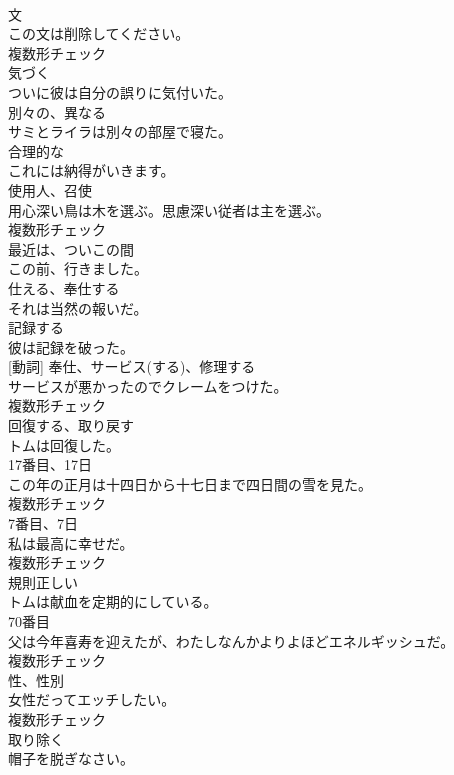 \documentclass[8pt]{extreport}
\begin{document}
\begin{CJK}{UTF8}{min}
\\	[名詞]	文	
\\	この文は削除してください。	
\\	複数形チェック
\\	[動詞]	気づく	
\\	ついに彼は自分の誤りに気付いた。	
\\	[形容詞]	別々の、異なる	
\\	サミとライラは別々の部屋で寝た。	
\\	[形容詞]	合理的な	
\\	これには納得がいきます。	
\\	[名詞]	使用人、召使	
\\	用心深い鳥は木を選ぶ。思慮深い従者は主を選ぶ。	
\\	複数形チェック
\\	[副詞]	最近は、ついこの間	
\\	この前、行きました。	
\\	[動詞]	仕える、奉仕する	
\\	それは当然の報いだ。	
\\	[動詞]	記録する	
\\	彼は記録を破った。	
\\	[名詞] [動詞]	奉仕、サービス(する)、修理する	
\\	サービスが悪かったのでクレームをつけた。	
\\	複数形チェック
\\	[動詞]	回復する、取り戻す	
\\	トムは回復した。	
\\	[名詞]	17番目、17日	
\\	この年の正月は十四日から十七日まで四日間の雪を見た。	
\\	複数形チェック
\\	[名詞]	7番目、7日	
\\	私は最高に幸せだ。	
\\	複数形チェック
\\	[形容詞]	規則正しい	
\\	トムは献血を定期的にしている。	
\\	[名詞]	70番目	
\\	父は今年喜寿を迎えたが、わたしなんかよりよほどエネルギッシュだ。	
\\	複数形チェック
\\	[名詞]	性、性別	
\\	女性だってエッチしたい。	
\\	複数形チェック
\\	[動詞]	取り除く	
\\	帽子を脱ぎなさい。	

\end{CJK}
\end{document}
